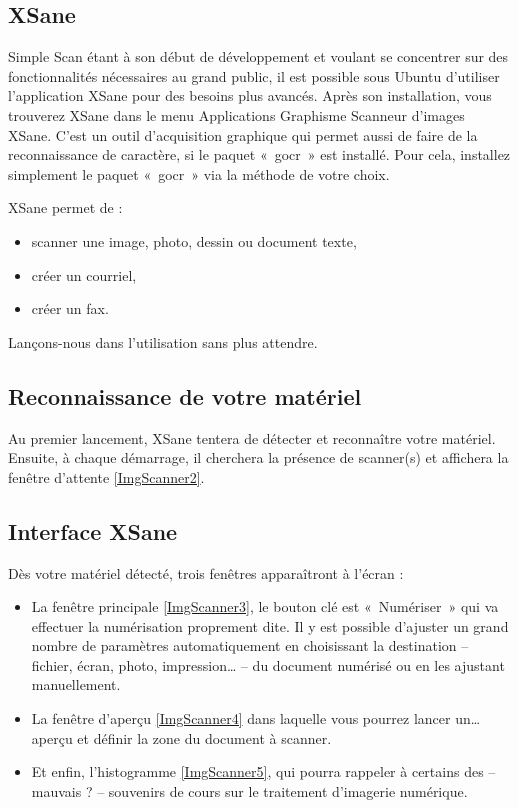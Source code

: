 \subsection{XSane}
Simple Scan étant à son début de développement et voulant se concentrer sur des fonctionnalités nécessaires au grand public, il est possible sous Ubuntu d'utiliser l'application XSane pour des besoins plus avancés. Après son installation, vous trouverez XSane dans le menu  Applications \FlecheDroite Graphisme \FlecheDroite Scanneur d'images XSane. C'est un outil d'acquisition graphique qui permet aussi de faire de la reconnaissance de caractère, si le paquet «~gocr~» est installé. Pour cela, installez simplement le paquet «~gocr~» via la méthode de votre choix.\par
XSane permet de :
\begin{itemize}
\item scanner une image, photo, dessin ou document texte, 
\item créer un courriel, 
\item créer un fax. 
\end{itemize}
Lançons-nous dans l'utilisation sans plus attendre.
\subsection{Reconnaissance de votre matériel}
Au premier lancement, XSane tentera de détecter et reconnaître votre matériel. Ensuite, à chaque démarrage, il cherchera la présence de scanner(s) et affichera la fenêtre d'attente \ref{ImgScanner2}.
\subsection{Interface XSane}
Dès votre matériel détecté, trois fenêtres apparaîtront à l'écran : 
\ScannerPresentation
\begin{itemize}
\item La fenêtre principale \ref{ImgScanner3}, le bouton clé est «~Numériser~» qui va effectuer la numérisation proprement dite. Il y est possible d'ajuster un grand nombre de paramètres automatiquement en choisissant la destination -- fichier, écran, photo, impression\ldots{} -- du document numérisé ou en les ajustant manuellement.
\item La fenêtre d'aperçu \ref{ImgScanner4} dans laquelle vous pourrez lancer un\ldots{} aperçu et définir la zone du document à scanner.
\item Et enfin, l'histogramme \ref{ImgScanner5}, qui pourra rappeler à certains des -- mauvais ? -- souvenirs de cours sur le traitement d'imagerie numérique.
\end{itemize}
